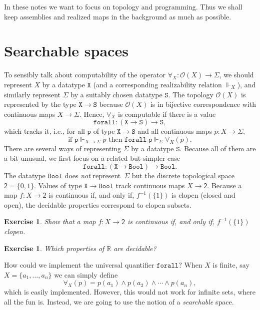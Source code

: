 \documentclass[a4paper,10pt]{article}
\newtheorem{exercise}[theorem]{Exercise}
\newcommand{\RR}{\mathbb{R}}
\newcommand{\set}[1]{\{#1\}}
\newcommand{\tpl}[1]{\mathcal{O}(#1)}
\newcommand{\two}{\mathsf{2}}
\newcommand{\Bool}{\mathtt{Bool}}
\newcommand{\R}[1]{\mathtt{#1}}
\newcommand{\rz}{\Vdash}
\begin{document}
In these notes we want to focus on topology and programming. Thus we shall keep assemblies and realized maps in
the background as much as possible.


\section{Searchable spaces}
\label{sec:searchable-spaces}

To sensibly talk about computability of the operator $\forall_X :
\tpl{X} \to \Sigma$, we should represent $X$ by a datatype
$\mathtt{X}$ (and a corresponding realizability relation $\rz_X$), and
similarly represent $\Sigma$ by a suitably chosen datatype
$\mathtt{S}$. The topology $\tpl{X}$ is represented by the type
$\mathtt{X} \to \mathtt{S}$ because $\tpl{X}$ is in bijective
correspondence with continuous maps $X \to \Sigma$. Hence, $\forall_X$
is computable if there is a value
%
\begin{equation*}
  \R{forall} : (\mathtt{X} \to \mathtt{S}) \to \mathtt{S},
\end{equation*}
%
which tracks it, i.e., for all $\R{p}$ of type $\mathtt{X} \to
\mathtt{S}$ and all continuous maps $p : X \to \Sigma$,
%
\begin{equation*}
  \text{if $\R{p} \rz_{X \to \Sigma} p$ then $\R{forall}\;\R{p}
    \rz_\Sigma \forall_X(p)$.}
\end{equation*}
%
There are several ways of representing $\Sigma$ by a datatype
$\mathtt{S}$. Because all of them are a bit unusual, we first focus on
a related but simpler case
%
\begin{equation}
  \label{eq:forall-bool}
  \mathtt{forall} : (\mathtt{X} \to \Bool) \to \Bool.
\end{equation}
%
The datatype $\Bool$ does \emph{not} represent~$\Sigma$ but the
discrete topological space $\two = \set{0, 1}$. Values of type
$\mathtt{X} \to \Bool$ track continuous maps $X \to \two$. Because a
map $f : X \to \two$ is continuous if, and only if, $f^{-1}(\set{1})$
is clopen (closed and open), the decidable properties correspond to
clopen subsets.

\begin{exercise}
  Show that a map $f : X \to \two$ is continuous if, and only if,
  $f^{-1}(\set{1})$ clopen.
\end{exercise}

\begin{exercise}
  Which properties of $\RR$ are decidable?
\end{exercise}
%
How could we implement the universal quantifier $\mathtt{forall}$?
When $X$ is finite, say $X =
\set{a_1, \ldots, a_n}$ we can simply define
%
\begin{equation*}
  \forall_X(p) = p(a_1) \land p(a_2) \land \cdots \land p(a_n),
\end{equation*}
%
which is easily implemented.
%
However, this would not work for infinite sets, where all the fun is. Instead, we are going to use the notion of
a \emph{searchable} space.
\end{document}
